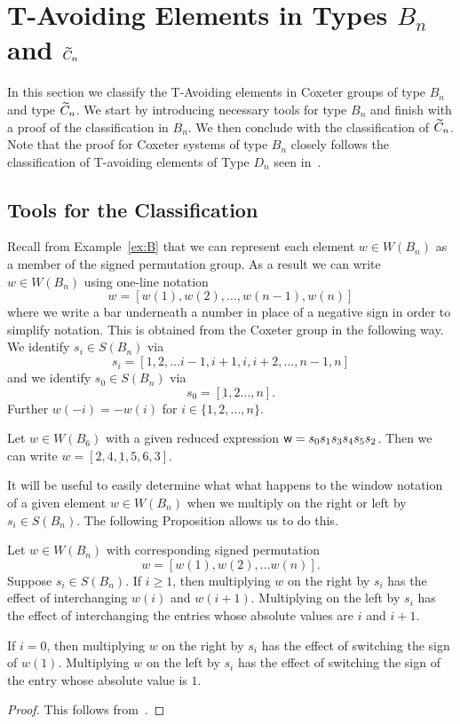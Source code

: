 \chapter{T-Avoiding Elements in Types $B_n$ and $\widetilde{C}_n$}\label{chap:BnandCn}

In this section we classify the T-Avoiding elements in Coxeter groups of type $B_n$ and type $\widetilde{C}_n$. We start by introducing necessary tools for type $B_n$ and finish with a proof of the classification in $B_n$. We then conclude with the classification of $\widetilde{C}_n$. Note that the proof for Coxeter systems of type $B_n$ closely follows the classification of T-avoiding elements of Type $D_n$ seen in~\cite{Gern2013a}.

\section{Tools for the Classification}

Recall from Example~\ref{ex:B} that we can represent each element $w \in W(B_n)$ as a member of the signed permutation group. As a result we can write $w \in W(B_n)$ using one-line notation 
\[ w=[w(1),w(2), \ldots, w(n-1), w(n)] \]
where we write a bar underneath a number in place of a negative sign in order to simplify notation. This is obtained from the Coxeter group in the following way. We identify $s_i \in S(B_n)$ via 
\[s_i=[1,2, \ldots i-1, i+1,i,i+2, \ldots, n-1,n] \] and we identify $s_0 \in S(B_n)$ via
\[s_0=[\underbar{1}, 2 \ldots, n].\] Further $w(-i)=-w(i)$ for $i \in \{1,2, \ldots, n\}$.

\begin{example}
Let $w \in W(B_6)$ with a given reduced expression $\mathsf{w}=s_0s_1s_3s_4s_5s_2$. Then we can write $w=[2, 4, \underbar{1}, 5, 6, 3]$. 
\end{example}

It will be useful to easily determine what what happens to the window notation of a given element $w \in W(B_n)$ when we multiply on the right or left by $s_i \in S(B_n)$. The following Proposition allows us to do this.

\begin{proposition}
	Let $w \in W(B_n)$ with corresponding signed permutation 
	\[w=[w(1),w(2), \ldots w(n)].\]
	Suppose $s_i \in S(B_n)$. If $i \geq 1$, then multiplying $w$ on the right by $s_i$ has the effect of interchanging $w(i)$ and $w(i+1)$. Multiplying on the left by $s_i$ has the effect of interchanging the entries whose absolute values are $i$ and $i+1$.
	
	If $i=0$, then multiplying $w$ on the right by $s_i$ has the effect of switching the sign of $w(1)$. Multiplying $w$ on the left by $s_i$ has the effect of switching the sign of the entry whose absolute value is $1$.
	\begin{proof}
	This follows from~\cite[Section 8.1 and A3.1]{Bjorner2005}.	
	\end{proof}
\end{proposition}


